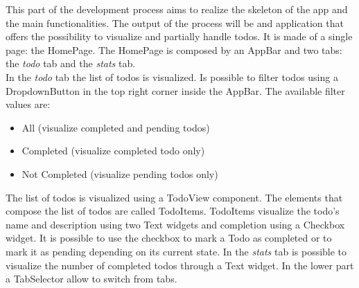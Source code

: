 
This part of the development process aims to realize the skeleton of the app and the main functionalities. The output of the process will be and application that offers the possibility to visualize and partially handle todos. It is made of a single page: the HomePage. The HomePage is composed by an AppBar and two tabs: the \textit{todo} tab and the \textit{stats} tab. \\
In the \textit{todo} tab the list of todos is visualized. Is possible to filter todos using a DropdownButton in the top right corner inside the AppBar. 
The available filter values are:
\begin{itemize}
    \item All (visualize completed and pending todos)
    \item Completed (visualize completed todo only)
    \item Not Completed (visualize pending todos only)
\end{itemize}
The list of todos is visualized using a TodoView component. The elements that compose the list of todos are called TodoItems. TodoItems visualize the todo’s name and description using two Text widgets and completion using a Checkbox widget. It is possible to use the checkbox to mark a Todo as completed or to mark it as pending depending on its current state. 
In the \textit{stats} tab is possible to visualize the number of completed todos through a Text widget.
In the lower part a TabSelector allow to switch from tabs.